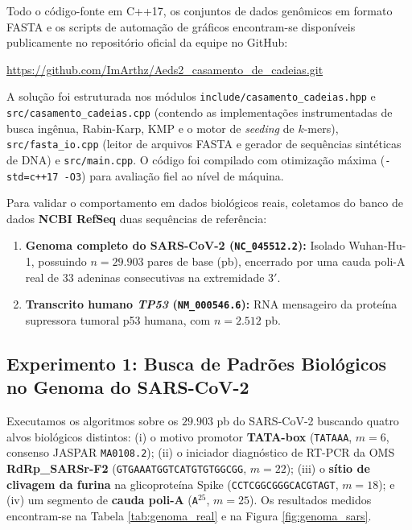 \documentclass[12pt,a4paper]{article}
\begin{document}
Todo o c\'odigo-fonte em C++17, os conjuntos de dados gen\^omicos em formato FASTA e os scripts de automa\c{c}\~ao de gr\'aficos encontram-se dispon\'iveis publicamente no reposit\'orio oficial da equipe no GitHub:
\begin{center}
    \url{https://github.com/ImArthz/Aeds2_casamento_de_cadeias.git}
\end{center}

{\sloppy A solu\c{c}\~ao foi estruturada nos m\'odulos \texttt{include/casamento\_cadeias.hpp} e \texttt{src/casamento\_cadeias.cpp} (contendo as implementa\c{c}\~oes instrumentadas de busca ing\^enua, Rabin-Karp, KMP e o motor de \textit{seeding} de $k$-mers), \texttt{src/fasta\_io.cpp} (leitor de arquivos FASTA e gerador de sequ\^encias sint\'eticas de DNA) e \texttt{src/main.cpp}. O c\'odigo foi compilado com otimiza\c{c}\~ao m\'axima (\texttt{-std=c++17 -O3}) para avalia\c{c}\~ao fiel ao n\'ivel de m\'aquina.\par}

Para validar o comportamento em dados biol\'ogicos reais, coletamos do banco de dados \textbf{NCBI RefSeq} duas sequ\^encias de refer\^encia:
\begin{enumerate}
    \item \textbf{Genoma completo do SARS-CoV-2 (\texttt{NC\_045512.2}):} Isolado Wuhan-Hu-1, possuindo $n = 29.903$ pares de base (pb), encerrado por uma cauda poli-A real de $33$ adeninas consecutivas na extremidade $3'$.
    \item \textbf{Transcrito humano \textit{TP53} (\texttt{NM\_000546.6}):} RNA mensageiro da prote\'ina supressora tumoral p53 humana, com $n = 2.512$ pb.
\end{enumerate}

\subsection{Experimento 1: Busca de Padr\~oes Biol\'ogicos no Genoma do SARS-CoV-2}

Executamos os algoritmos sobre os $29.903$ pb do SARS-CoV-2 buscando quatro alvos biol\'ogicos distintos: (i) o motivo promotor \textbf{TATA-box} (\texttt{TATAAA}, $m=6$, consenso JASPAR \texttt{MA0108.2}); (ii) o iniciador diagn\'ostico de RT-PCR da OMS \textbf{RdRp\_SARSr-F2} (\texttt{GTGAAATGGTCATGTGTGGCGG}, $m=22$); (iii) o \textbf{s\'itio de clivagem da furina} na glicoprote\'ina Spike (\texttt{CCTCGGCGGGCACGTAGT}, $m=18$); e (iv) um segmento de \textbf{cauda poli-A} (\texttt{A}$^{25}$, $m=25$). Os resultados medidos encontram-se na Tabela \ref{tab:genoma_real} e na Figura \ref{fig:genoma_sars}.
\end{document}
